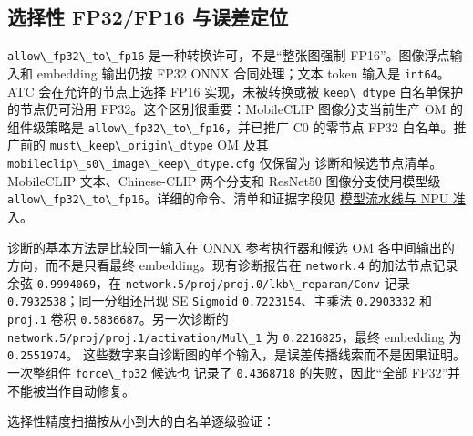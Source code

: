 \subsection{选择性 FP32/FP16
与误差定位}\label{ux9009ux62e9ux6027-fp32fp16-ux4e0eux8befux5deeux5b9aux4f4d}

\passthrough{\lstinline!allow\_fp32\_to\_fp16!}
是一种转换许可，不是``整张图强制 FP16''。图像浮点输入和 embedding
输出仍按 FP32 ONNX 合同处理；文本 token 输入是
\passthrough{\lstinline!int64!}。ATC 会在允许的节点上选择 FP16
实现，未被转换或被 \passthrough{\lstinline!keep\_dtype!}
白名单保护的节点仍可沿用 FP32。这个区别很重要：MobileCLIP
图像分支当前生产 OM 的组件级策略是
\passthrough{\lstinline!allow\_fp32\_to\_fp16!}，并已推广 C0 的零节点
FP32 白名单。推广前的
\passthrough{\lstinline!must\_keep\_origin\_dtype!} OM 及其
\passthrough{\lstinline!mobileclip\_s0\_image\_keep\_dtype.cfg!}
仅保留为 诊断和候选节点清单。MobileCLIP 文本、Chinese-CLIP 两个分支和
ResNet50 图像分支使用模型级
\passthrough{\lstinline!allow\_fp32\_to\_fp16!}。详细的命令、清单和证据字段见
\href{https://github.com/zhouxzh/Ascend310/blob/main/samples/case7/docs/05-models-and-npu.md}{模型流水线与
NPU 准入}。

诊断的基本方法是比较同一输入在 ONNX 参考执行器和候选 OM
各中间输出的方向，而不是只看最终 embedding。现有诊断报告在
\passthrough{\lstinline!network.4!} 的加法节点记录余弦
\passthrough{\lstinline!0.9994069!}，在
\passthrough{\lstinline!network.5/proj/proj.0/lkb\_reparam/Conv!} 记录
\passthrough{\lstinline!0.7932538!}；同一分组还出现 SE
\passthrough{\lstinline!Sigmoid!}
\passthrough{\lstinline!0.7223154!}、主乘法
\passthrough{\lstinline!0.2903332!} 和 \passthrough{\lstinline!proj.1!}
卷积 \passthrough{\lstinline!0.5836687!}。另一次诊断的
\passthrough{\lstinline!network.5/proj/proj.1/activation/Mul\_1!} 为
\passthrough{\lstinline!0.2216825!}，最终 embedding 为
\passthrough{\lstinline!0.2551974!}。
这些数字来自诊断图的单个输入，是误差传播线索而不是因果证明。一次整组件
\passthrough{\lstinline!force\_fp32!} 候选也 记录了
\passthrough{\lstinline!0.4368718!} 的失败，因此``全部
FP32''并不能被当作自动修复。

选择性精度扫描按从小到大的白名单逐级验证：

